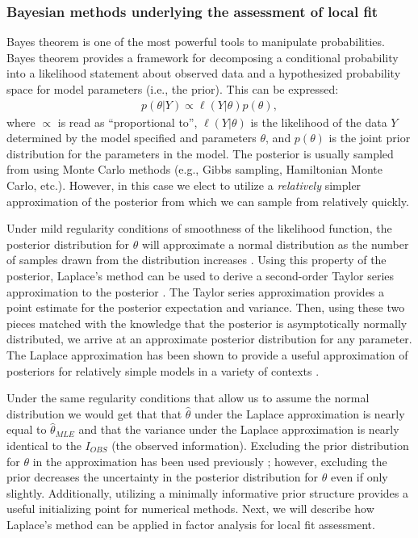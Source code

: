 \documentclass[man, noextraspace, floatsintext, 12pt]{apa7}
\begin{document}
\subsubsection{Bayesian methods underlying the assessment of local fit}

Bayes theorem is one of the most powerful tools to manipulate probabilities. 
Bayes theorem provides a framework for decomposing a conditional probability into a likelihood statement about observed data and a hypothesized probability space for model parameters (i.e., the prior).
This can be expressed:
\begin{align*}
p(\theta \vert Y) \propto \ell (Y \vert \theta)p(\theta),
\end{align*}
where $\propto$ is read as ``proportional to'', $\ell (Y \vert \theta)$ is the likelihood of the data $Y$ determined by the model specified and parameters $\theta$, and $p(\theta)$ is the joint prior distribution for the parameters in the model.
The posterior is usually sampled from using Monte Carlo methods (e.g., Gibbs sampling, Hamiltonian Monte Carlo, etc.).
However, in this case we elect to utilize a \textit{relatively} simpler approximation of the posterior from which we can sample from relatively quickly.

Under mild regularity conditions of smoothness of the likelihood function, the posterior distribution for $\theta$ will approximate a normal distribution as the number of samples drawn from the distribution increases \citep{DBA3}.
Using this property of the posterior, Laplace's method can be used to derive a second-order Taylor series approximation to the posterior \citep{Tierney1986}.
The Taylor series approximation provides a point estimate for the posterior expectation and variance.
Then, using these two pieces matched with the knowledge that the posterior is asymptotically normally distributed, we arrive at an approximate posterior distribution for any parameter. 
The Laplace approximation has been shown to provide a useful approximation of posteriors for relatively simple models in a variety of contexts \citep{Kass1989, Rue2009}.

Under the same regularity conditions that allow us to assume the normal distribution we would get that that $\hat{\theta}$ under the Laplace approximation is nearly equal to $\hat{\theta}_{MLE}$ and that the variance under the Laplace approximation is nearly identical to the $I_{OBS}$  (the observed information). %
Excluding the prior distribution for $\theta$ in the approximation has been used previously \citep{Lee2016, Rue2009, Wolfinger1993, Li1992}; however, excluding the prior decreases the uncertainty in the posterior distribution for $\theta$ even if only slightly.
Additionally, utilizing a minimally informative prior structure provides a useful initializing point for numerical methods.
Next, we will describe how Laplace's method can be applied in factor analysis for local fit assessment.
\end{document}
